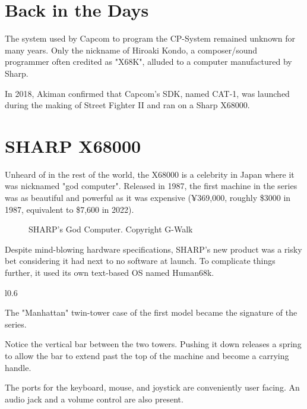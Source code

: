 \pagebreak

\section{Back in the Days}
The system used by Capcom to program the CP-System remained unknown for many years. Only the nickname of Hiroaki Kondo, a composer/sound programmer often credited as "X68K", alluded to a computer manufactured by Sharp. 

In 2018,  Akiman confirmed\cite{x68000usage1}\cite{x68000usage2} that Capcom's SDK, named CAT-1, was launched during the making of Street Fighter II and ran on a Sharp X68000.

\section{SHARP X68000}

Unheard of in the rest of the world, the X68000 is a celebrity in Japan where it was nicknamed "god computer". 
Released in 1987, the first machine in the series was as beautiful and powerful as it was expensive (¥369,000, roughly \$3000 in 1987, equivalent to \$7,600 in 2022).

\vfill

 \begin{figure}[H]
\caption*{SHARP's God Computer. Copyright G-Walk\cite{x68k_perfect_catalogue}}
\end{figure}


Despite mind-blowing hardware specifications, SHARP's new product was a risky bet considering it had next to no software at launch. To complicate things further, it used its own text-based OS named Human68k.


\begin{wrapfigure}[35]{l}{0.6\textwidth}
\centering
{}
\end{wrapfigure}

The "Manhattan" twin-tower case of the first model became the signature of the series. 

Notice the vertical bar between the two towers. Pushing it down releases a spring to allow the bar to extend past the top of the machine and become a carrying handle.


The ports for the keyboard, mouse, and joystick are conveniently user facing. An audio jack and a volume control are also present.

